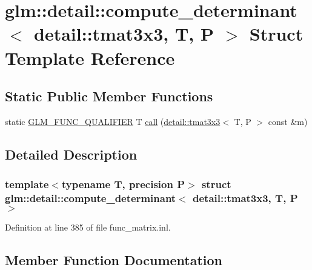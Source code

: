 \hypertarget{structglm_1_1detail_1_1compute__determinant_3_01detail_1_1tmat3x3_00_01_t_00_01_p_01_4}{}\section{glm\+:\+:detail\+:\+:compute\+\_\+determinant$<$ detail\+:\+:tmat3x3, T, P $>$ Struct Template Reference}
\label{structglm_1_1detail_1_1compute__determinant_3_01detail_1_1tmat3x3_00_01_t_00_01_p_01_4}
\subsection*{Static Public Member Functions}
\begin{DoxyCompactItemize}
\item 
static \hyperlink{setup_8hpp_a33fdea6f91c5f834105f7415e2a64407}{G\+L\+M\+\_\+\+F\+U\+N\+C\+\_\+\+Q\+U\+A\+L\+I\+F\+I\+ER} T \hyperlink{structglm_1_1detail_1_1compute__determinant_3_01detail_1_1tmat3x3_00_01_t_00_01_p_01_4_aacdeab0c051558a445f3f674dd6a5e8b}{call} (\hyperlink{structglm_1_1detail_1_1tmat3x3}{detail\+::tmat3x3}$<$ T, P $>$ const \&m)
\end{DoxyCompactItemize}


\subsection{Detailed Description}
\subsubsection*{template$<$typename T, precision P$>$\newline
struct glm\+::detail\+::compute\+\_\+determinant$<$ detail\+::tmat3x3, T, P $>$}



Definition at line 385 of file func\+\_\+matrix.\+inl.



\subsection{Member Function Documentation}
\mbox{\label{structglm_1_1detail_1_1compute__determinant_3_01detail_1_1tmat3x3_00_01_t_00_01_p_01_4_aacdeab0c051558a445f3f674dd6a5e8b}} 
